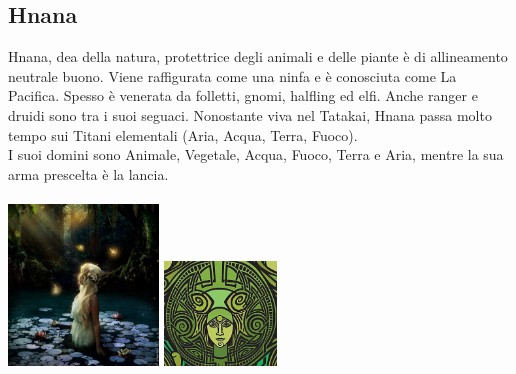 \documentclass[10pt, a4paper]{report}
\begin{document}
\begin{multicols}{2}
\subsection*{Hnana}
Hnana, dea della natura, protettrice degli animali e delle piante è di allineamento neutrale buono. Viene raffigurata come una ninfa e è conosciuta come La Pacifica. Spesso è venerata da folletti, gnomi, halfling ed elfi. Anche ranger e druidi sono tra i suoi seguaci. Nonostante viva nel Tatakai, Hnana passa molto tempo sui Titani elementali (Aria, Acqua, Terra, Fuoco). \\
I suoi domini sono Animale, Vegetale, Acqua, Fuoco, Terra e Aria, mentre la sua arma prescelta è la lancia.\\
\\
\includegraphics[width = 4cm]{hnana.jpeg}
\includegraphics[width = 3cm]{hnana_simbolo.jpeg}\\

\end{multicols}
\end{document}
